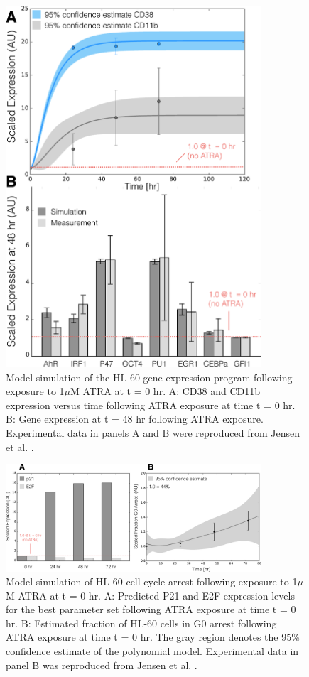 \documentclass[12pt]{article}
\begin{document}
\begin{figure}[!t]\centering
\includegraphics[width=0.85\textwidth]{./figs/Fig-4-GRN-Simulations.pdf}
\caption{Model simulation of the HL-60 gene expression program following exposure to 1$\mu$M ATRA at t = 0 hr.
A: CD38 and CD11b expression versus time following ATRA exposure at time t = 0 hr.
B: Gene expression at t = 48 hr following ATRA exposure.
Experimental data in panels A and B were reproduced from Jensen et al. \cite{Jensen:2015aa}.}\label{fig:model-grn-simulations}
\end{figure}

\begin{figure}[!t]\centering
\includegraphics[width=0.85\textwidth]{./figs/Fig-5-GRN-CellCycle-Predictions.pdf}
\caption{Model simulation of HL-60 cell-cycle arrest following exposure to 1$\mu$M ATRA at t = 0 hr.
A: Predicted P21 and E2F expression levels for the best parameter set following ATRA exposure at time t = 0 hr.
B: Estimated fraction of HL-60 cells in G0 arrest following ATRA exposure at time t = 0 hr.
The gray region denotes the 95\% confidence estimate of the polynomial model.
Experimental data in panel B was reproduced from Jensen et al. \cite{Jensen:2015aa}.}\label{fig:model-cell-cycle-simulations}
\end{figure}
\end{document}
